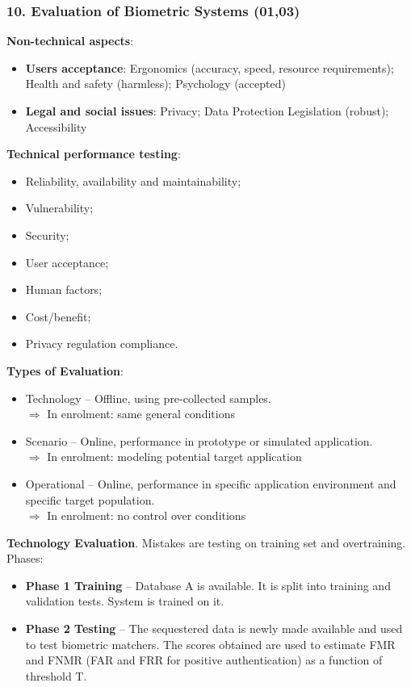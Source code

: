 \documentclass[a4paper]{article}
\begin{document}
    \subsubsection*{10. Evaluation of Biometric Systems (01,03)}
      \textbf{Non-technical aspects}:
      \begin{itemize}
        \item \textbf{Users acceptance}: Ergonomics (accuracy, speed, resource requirements); Health and safety (harmless); Psychology (accepted)
        \item \textbf{Legal and social issues}: Privacy; Data Protection Legislation (robust); Accessibility
      \end{itemize}

      \textbf{Technical performance testing}:
      \begin{itemize}
        \item Reliability, availability and maintainability;
        \item Vulnerability;
        \item Security;
        \item User acceptance;
        \item Human factors;
        \item Cost/benefit;
        \item Privacy regulation compliance.
      \end{itemize}

      \textbf{Types of Evaluation}:
      \begin{itemize}
        \item Technology -- Offline, using pre-collected samples.
        \\ $\Rightarrow$ In enrolment: same general conditions
        \item Scenario -- Online, performance in prototype or simulated application.
        \\ $\Rightarrow$ In enrolment: modeling potential target application
        \item Operational -- Online, performance in specific application environment and specific target population.
        \\ $\Rightarrow$ In enrolment: no control over conditions
      \end{itemize}

      \textbf{Technology Evaluation}. Mistakes are testing on training set and overtraining. Phases:
      \begin{itemize}
        \item \textbf{Phase 1 Training} -- Database A is available. It is split into training and validation tests. System is trained on it.
        \item \textbf{Phase 2 Testing} -- The sequestered data is newly made available and used to test biometric matchers. The scores obtained are used to estimate FMR and FNMR (FAR and FRR for positive authentication) as a function of threshold T.
      \end{itemize}
\end{document}
